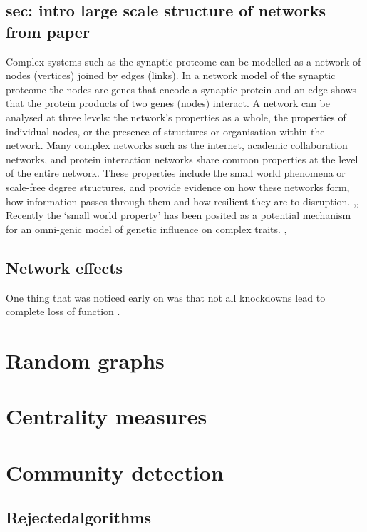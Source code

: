 \subsection{sec: intro large scale structure of networks from paper}
Complex systems such as the synaptic proteome can be modelled as a network of nodes (vertices) joined by edges (links). In a network model of the synaptic proteome the nodes are genes that encode a synaptic protein and an edge shows that the protein products of two genes (nodes) interact. A network can be analysed at three levels: the network’s properties as a whole, the properties of individual nodes, or the presence of structures or organisation within the network.  \cite{newman2012communities}   
Many complex networks such as the internet, academic collaboration networks, and protein interaction networks share common properties at the level of the entire network. These properties include the small world phenomena or scale-free degree structures\cite{barabasi1999emergence},\cite{watts1998collective}  and provide evidence on how these networks form, how information passes through them and how resilient they are to disruption. \cite{rosvall2008maps},\cite{albert2000error},\cite{bianconi2001competition}  Recently the ‘small world property’ has been posited as a potential mechanism for an omni-genic model of genetic influence on complex traits. \cite{watts1998collective},\cite{boyle2017expanded} 
\subsection{Network effects}
One thing that was noticed early on was that not all knockdowns lead to complete loss of function \cite{keverne1997evaluation}. \cite{charlesworth2016canalization}
\section{Random graphs}
\label{sec: intro_random_graphs}
\section{Centrality measures}
\label{sec: intro_centrality_measures}
\section{Community detection}
\subsection{Rejectedalgorithms}

